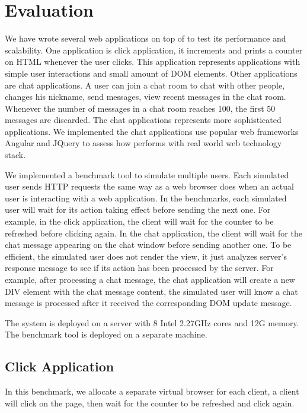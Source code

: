 \section{Evaluation}
\label{sec:eval}
We have wrote several web applications on top of \cb{} to test its
performance and scalability.
One application is click application,
it increments and prints a counter on HTML whenever the user clicks.
This application represents applications with simple user interactions and small amount of DOM elements.
Other applications are chat applications.
A user can join a chat room to chat with other people,
changes his nickname, send messages, view recent messages in the chat room.
Whenever the number of messages in a chat room reaches 100, the first 50 messages
are discarded.
The chat applications represents more sophisticated applications.
We implemented the chat applications use popular web frameworks Angular and JQuery
to assess how \cb{} performs with real world web technology stack.

\chatroomfig{}

We implemented a benchmark tool to simulate multiple users.
Each simulated user sends HTTP requests the same way as
a web browser does when an actual user is interacting with a web application.
In the benchmarks, each simulated user will wait for its action taking effect before 
sending the next one.
For example, in the click application, the client will wait for the counter
to be refreshed before clicking again.
In the chat application, the client will wait for
the chat message appearing on the chat window before sending another one.
To be efficient, the simulated user does not render the view, 
it just analyzes server's response message to see if its action has been processed by
the server.
For example, after processing a chat message, 
the chat application will create a new DIV element with the chat message content, 
the simulated user will know a chat message is processed after it received
the corresponding DOM update message.

The \cb{} system is deployed on a server with 8 Intel 2.27GHz cores and 12G memory.
The benchmark tool is deployed on a separate machine.

\subsection{Click Application}
In this benchmark,
we allocate a separate virtual browser for each client,
a client will click on the page, then wait for the counter to be refreshed and click again.

